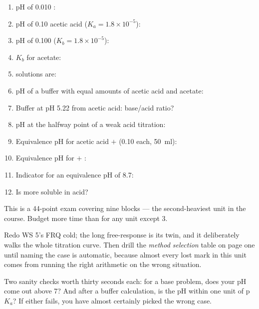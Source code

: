 \documentclass{apchem-worksheet}
\begin{document}
\begin{enumerate}[leftmargin=*,itemsep=0.34em]
  \item pH of \SI{0.010}{\Molar} :
  \item pH of \SI{0.10}{\Molar} acetic acid ($K_a = 1.8\times10^{-5}$):
  \item pH of \SI{0.100}{\Molar}  ($K_b = 1.8\times10^{-5}$):
  \item $K_b$ for acetate: 
  \item {} solutions are: 
  \item pH of a buffer with equal amounts of acetic acid and acetate:
  \item Buffer at pH 5.22 from acetic acid: base/acid ratio?
  \item pH at the halfway point of a weak acid titration:
  \item Equivalence pH for acetic acid $+$ 
        (\SI{0.10}{\Molar} each, \SI{50}{\milli\litre}):
  \item Equivalence pH for  $+$ :
  \item Indicator for an equivalence pH of 8.7:
  \item Is  more soluble in acid?
\end{enumerate}

\begin{apcnote}
This is a 44-point exam covering nine blocks --- the second-heaviest unit in
the course. Budget more time than for any unit except 3.

Redo WS 5's FRQ cold; the long free-response is its twin, and it
deliberately walks the whole titration curve. Then drill the \emph{method
selection} table on page one until naming the case is automatic, because
almost every lost mark in this unit comes from running the right arithmetic
on the wrong situation.

Two sanity checks worth thirty seconds each: for a base problem, does your
pH come out above 7? And after a buffer calculation, is the pH within one
unit of p$K_a$? If either fails, you have almost certainly picked the wrong
case.
\end{apcnote}
\end{document}
